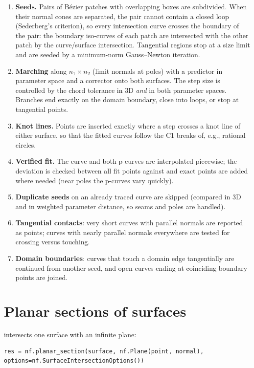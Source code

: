 \begin{enumerate}
\item \textbf{Seeds.} Pairs of Bézier patches with overlapping boxes are subdivided. When
their normal cones are separated, the pair cannot contain a closed loop (Sederberg's
criterion), so every intersection curve crosses the boundary of the pair: the boundary
iso-curves of each patch are intersected with the other patch by the curve/surface
intersection. Tangential regions stop at a size limit and are seeded by a minimum-norm
Gauss--Newton iteration.
\item \textbf{Marching} along $n_1\times n_2$ (limit normals at poles) with a predictor in
parameter space and a corrector onto both surfaces. The step size is controlled by the chord
tolerance in 3D \emph{and} in both parameter spaces. Branches end exactly on the domain
boundary, close into loops, or stop at tangential points.
\item \textbf{Knot lines.} Points are inserted exactly where a step crosses a knot line of
either surface, so that the fitted curves follow the C1 breaks of, e.g., rational circles.
\item \textbf{Verified fit.} The curve and both p-curves are interpolated piecewise; the
deviation is checked between all fit points against  and exact points
are added where needed (near poles the p-curves vary quickly).
\item \textbf{Duplicate seeds} on an already traced curve are skipped (compared in 3D and in
weighted parameter distance, so seams and poles are handled).
\item \textbf{Tangential contacts}: very short curves with parallel normals are reported as
points; curves with nearly parallel normals everywhere are tested for crossing versus
touching.
\item \textbf{Domain boundaries}: curves that touch a domain edge tangentially are continued
from another seed, and open curves ending at coinciding boundary points are joined.
\end{enumerate}

\section{Planar sections of surfaces}\label{sec:planar-section}

 intersects one surface with an infinite plane:

\begin{lstlisting}
res = nf.planar_section(surface, nf.Plane(point, normal), options=nf.SurfaceIntersectionOptions())
\end{lstlisting}

